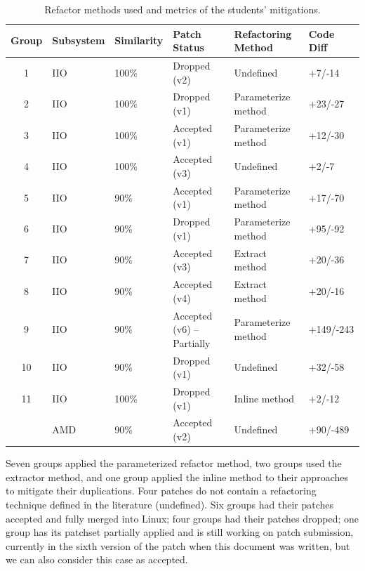 \documentclass[10pt,conference]{IEEEtran}
\begin{document}
\begin{table}
\centering
\caption{Refactor methods used and metrics of the students' mitigations.}
\begin{tabular}{ | c | m{15mm} | m{20mm} | m{30mm} | m{30mm} | m{20mm} | }
\hline
\textbf{Group} & \textbf{Subsystem} & \textbf{Similarity} & \textbf{Patch Status} & \textbf{Refactoring Method} & \textbf{Code Diff} \\
\hline

1 & IIO & 100\% & Dropped (v2) & Undefined & +7/-14 \\ \hline
2 & IIO & 100\% & Dropped (v1) & Parameterize method & +23/-27 \\ \hline
3 & IIO & 100\% & Accepted (v1) & Parameterize method & +12/-30 \\ \hline
4 & IIO & 100\% & Accepted (v3) & Undefined & +2/-7 \\ \hline
5 & IIO & 90\% & Accepted (v1) & Parameterize method & +17/-70 \\ \hline
6 & IIO & 90\% & Dropped (v1) & Parameterize method & +95/-92 \\ \hline
7 & IIO & 90\% & Accepted (v3) & Extract method & +20/-36 \\ \hline
8 & IIO & 90\% & Accepted (v4) & Extract method & +20/-16 \\ \hline
9 & IIO & 90\% & Accepted (v6) -- Partially & Parameterize method & +149/-243 \\ \hline
10 & IIO & 90\% & Dropped (v1) & Undefined & +32/-58 \\ \hline
11 & IIO & 100\% & Dropped (v1) & Inline method & +2/-12 \\ 
   & AMD & 90\% & Accepted (v2) & Undefined & +90/-489 \\ \hline

\end{tabular}%

\label{tab:stu}
\end{table}

Seven groups applied the parameterized refactor method, two groups used the extractor method, and one group applied the inline method to their approaches to mitigate their duplications. Four patches do not contain a refactoring technique defined in the literature (undefined). Six groups had their patches accepted and fully merged into Linux; four groups had their patches dropped; one group has its patchset partially applied and is still working on patch submission, currently in the sixth version of the patch when this document was written, but we can also consider this case as accepted.
\end{document}
